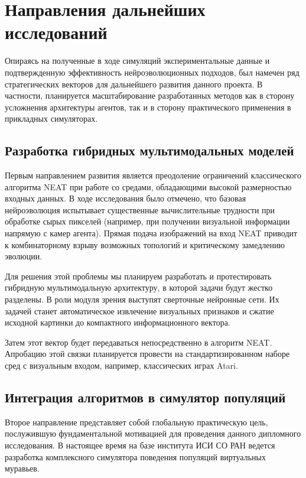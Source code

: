 \section{Направления дальнейших исследований}

Опираясь на полученные в ходе симуляций экспериментальные данные и подтвержденную эффективность нейроэволюционных подходов, был намечен ряд стратегических векторов для дальнейшего развития данного проекта. В частности, планируется масштабирование разработанных методов как в сторону усложнения архитектуры агентов, так и в сторону практического применения в прикладных симуляторах.

\subsection{Разработка гибридных мультимодальных моделей}

Первым направлением развития является преодоление ограничений классического алгоритма NEAT при работе со средами, обладающими высокой размерностью входных данных. В ходе исследования было отмечено, что базовая нейроэволюция испытывает существенные вычислительные трудности при обработке сырых пикселей (например, при получении визуальной информации напрямую с камер агента). Прямая подача изображений на вход NEAT приводит к комбинаторному взрыву возможных топологий и критическому замедлению эволюции.

Для решения этой проблемы мы планируем разработать и протестировать гибридную мультимодальную архитектуру, в которой задачи будут жестко разделены. В роли модуля зрения выступят сверточные нейронные сети. Их задачей станет автоматическое извлечение визуальных признаков и сжатие исходной картинки до компактного информационного вектора.

Затем этот вектор будет передаваться непосредственно в алгоритм NEAT. Апробацию этой связки планируется провести на стандартизированном наборе сред с визуальным входом, например, классических играх Atari.

\subsection{Интеграция алгоритмов в симулятор популяций}

Второе направление представляет собой глобальную практическую цель, послужившую фундаментальной мотивацией для проведения данного дипломного исследования. В настоящее время на базе института ИСИ СО РАН ведется разработка комплексного симулятора поведения популяций виртуальных муравьев.

